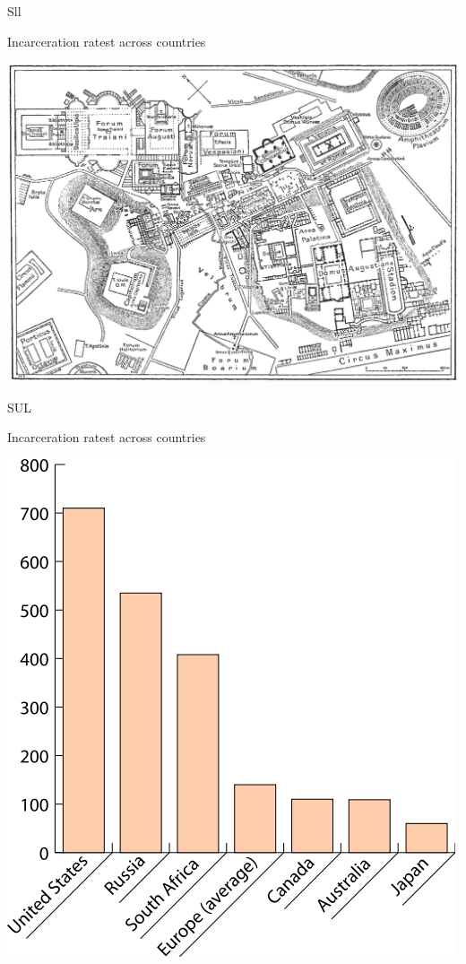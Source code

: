 \begin{map}{S}{ll}
\caption{Incarceration ratest across countries}
\label{chart:incarceration}
\includegraphics[width=\chartwidth,height=\chartheight]{Rome}  
\end{map}

\lipsum[1-2]

\begin{chart}{S}{UL}
\caption{Incarceration ratest across countries}
\label{chart:incarceration}
\includegraphics[width=\chartwidth,height=\chartheight]{incarceration}  
\end{chart}


